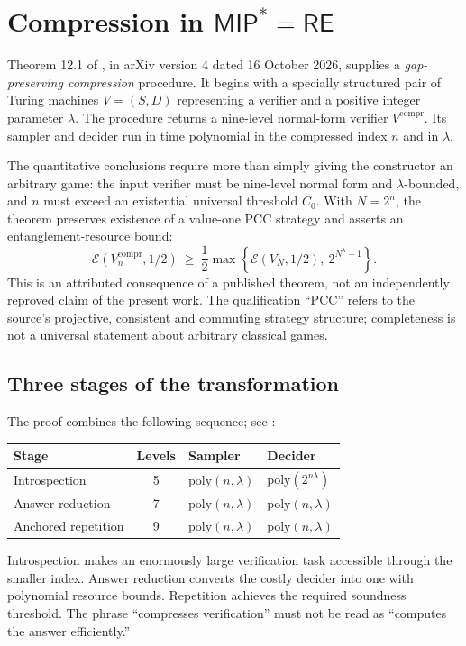 \documentclass[11pt,a4paper]{article}
\newcommand{\RE}{\mathsf{RE}}
\newcommand{\MIP}{\mathsf{MIP}}
\newcommand{\E}{\mathcal{E}}
\begin{document}
\section{Compression in $\MIP^*=\RE$}
Theorem 12.1 of \cite{jnvwy}, in arXiv version 4 dated 16 October 2026, supplies a \emph{gap-preserving compression} procedure. It begins with a specially structured pair of Turing machines $V=(S,D)$ representing a verifier and a positive integer parameter $\lambda$. The procedure returns a nine-level normal-form verifier $V^{\mathrm{compr}}$. Its sampler and decider run in time polynomial in the compressed index $n$ and in $\lambda$.

The quantitative conclusions require more than simply giving the constructor an arbitrary game: the input verifier must be nine-level normal form and $\lambda$-bounded, and $n$ must exceed an existential universal threshold $C_0$. With $N=2^n$, the theorem preserves existence of a value-one PCC strategy and asserts an entanglement-resource bound:
\begin{equation}\label{eq:compression}
\E(V_n^{\mathrm{compr}},1/2)\ \ge\ \frac12\max\!\left\{\E(V_N,1/2),\ 2^{N^\lambda-1}\right\}.
\end{equation}
This is an attributed consequence of a published theorem, not an independently reproved claim of the present work. The qualification ``PCC'' refers to the source's projective, consistent and commuting strategy structure; completeness is not a universal statement about arbitrary classical games.

\subsection{Three stages of the transformation}
The proof combines the following sequence; see \cite[Theorems 8.3, 10.30, 11.4; Theorem 12.1, Fig. 15, Table 2]{jnvwy}:
\begin{center}
\begin{tabular}{@{}p{.28\linewidth}cp{.26\linewidth}p{.27\linewidth}@{}}\toprule
Stage & Levels & Sampler & Decider \\ \midrule
Introspection & 5 & $\mathrm{poly}(n,\lambda)$ & $\mathrm{poly}(2^{n\lambda})$\\
Answer reduction & 7 & $\mathrm{poly}(n,\lambda)$ & $\mathrm{poly}(n,\lambda)$\\
Anchored repetition & 9 & $\mathrm{poly}(n,\lambda)$ & $\mathrm{poly}(n,\lambda)$\\ \bottomrule
\end{tabular}
\end{center}
Introspection makes an enormously large verification task accessible through the smaller index. Answer reduction converts the costly decider into one with polynomial resource bounds. Repetition achieves the required soundness threshold. The phrase ``compresses verification'' must not be read as ``computes the answer efficiently.''
\end{document}
